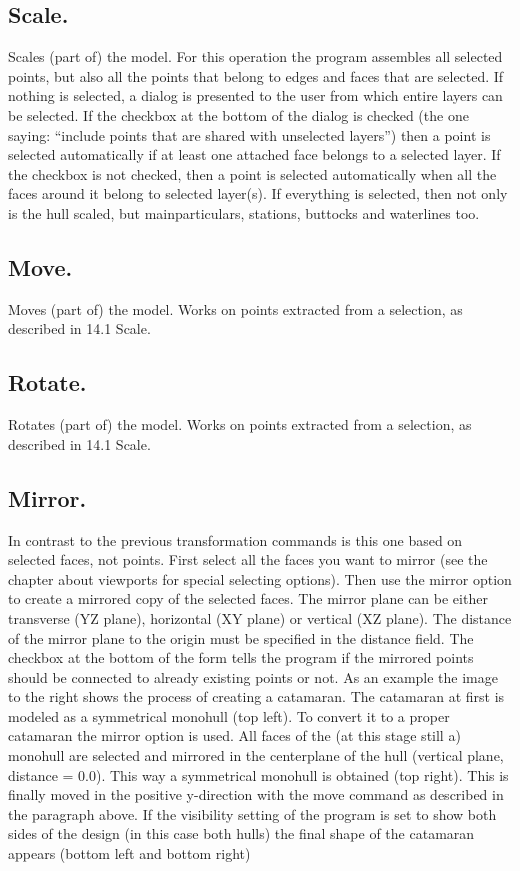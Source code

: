 \documentclass[12pt]{article}
\begin{document}
\subsection{Scale.}
Scales (part of) the model. For this operation the program assembles all selected points, but also
all the points that belong to edges and faces that are selected. If nothing is selected, a dialog is
presented to the user from which entire layers can be selected. If the checkbox at the bottom of the
dialog is checked (the one saying: “include points that are shared with unselected layers”) then a
point is selected automatically if at least one attached face belongs to a selected layer. If the
checkbox is not checked, then a point is selected automatically when all the faces around it belong
to selected layer(s). If everything is selected, then not only is the hull scaled, but mainparticulars,
stations, buttocks and waterlines too.

\subsection{Move.}
Moves (part of) the model. Works on points extracted from a selection, as described in 14.1 Scale.

\subsection{Rotate.}
Rotates (part of) the model. Works on points extracted from a selection, as described in 14.1 Scale.

\subsection{Mirror.}
In contrast to the previous transformation commands is this one based on
selected faces, not points. First select all the faces you want to mirror (see the
chapter about viewports for special selecting options). Then use the mirror
option to create a mirrored copy of the selected faces. The mirror plane can be
either transverse (YZ plane), horizontal (XY plane) or vertical (XZ plane). The
distance of the mirror plane to the origin must be specified in the distance field.
The checkbox at the bottom of the form tells the program if the mirrored points
should be connected to already existing points or not.
As an example the image to the right shows the process of creating a catamaran. The catamaran at
first is modeled as a symmetrical monohull (top left). To
convert it to a proper catamaran the mirror option is used. All
faces of the (at this stage still a) monohull are selected and
mirrored in the centerplane of the hull (vertical plane,
distance = 0.0). This way a symmetrical monohull is obtained
(top right). This is finally moved in the positive y-direction
with the move command as described in the paragraph
above. If the visibility setting of the program is set to show
both sides of the design (in this case both hulls) the final
shape of the catamaran appears (bottom left and bottom
right)
\end{document}
